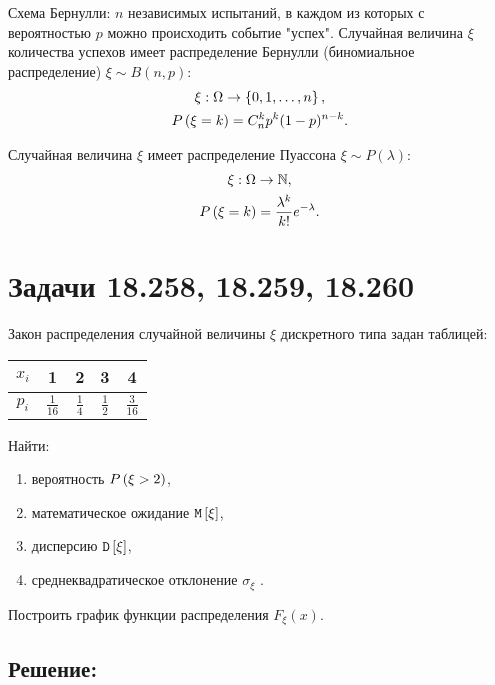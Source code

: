 Схема Бернулли: $n$ независимых испытаний, в каждом из которых с вероятностью $p$ можно происходить событие "успех"{}.
Случайная величина $\xi$ количества успехов имеет распределение Бернулли (биномиальное распределение) $\xi \sim B(n,p)$:
\begin{gather}
    \xi : \Omega \rightarrow \left \{ 0, 1, \dots, n \right \} \notag, \\
    P \left ( \xi = k \right ) = C_n^k p^k (1-p)^{n-k} .
\end{gather}

Случайная величина $\xi$ имеет распределение Пуассона $\xi \sim P(\lambda)$:
\begin{gather}
    \xi : \Omega \rightarrow \mathbb{N}, \\
    P \left ( \xi = k \right ) = \frac{\lambda^k}{k!} e^{-\lambda} .
\end{gather}

\section*{Задачи 18.258, 18.259, 18.260}

Закон распределения случайной величины $\xi$ дискретного типа задан таблицей:
\begin{center}
    \begin{tabular}{|c|c|c|c|c|}
        \hline
        $x_i$ & 1              & 2             & 3             & 4              \\
        \hline
        $p_i$ & $\frac{1}{16}$ & $\frac{1}{4}$ & $\frac{1}{2}$ & $\frac{3}{16}$ \\
        \hline
    \end{tabular}
\end{center}

Найти:
\begin{enumerate}
    \item вероятность $P \left ( \xi > 2 \right )$,
    \item математическое ожидание $\mathtt{M} \left [ \xi \right ]$,
    \item дисперсию $\mathtt{D} \left [ \xi \right ]$,
    \item среднеквадратическое отклонение $\sigma_\xi$ .
\end{enumerate}

Построить график функции распределения $F_\xi(x)$.

\subsection*{Решение:}

